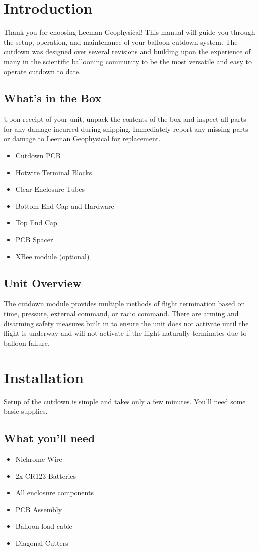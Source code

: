 \documentclass[letter,12pt,oneside,pdflatex,italian,final,twocolumn]{article}
\begin{document}
\newpage
\section{Introduction}
Thank you for choosing Leeman Geophysical! This manual will guide you through the setup, operation, and maintenance of your balloon cutdown system. The cutdown was designed over several revisions and building upon the experience of many in the scientific ballooning community to be the most versatile and easy to operate cutdown to date.

\subsection{What's in the Box}
Upon receipt of your unit, unpack the contents of the box and inspect all parts for any damage incurred during shipping. Immediately report any missing parts or damage to Leeman Geophysical for replacement.
\begin{itemize}
	\item Cutdown PCB
	\item Hotwire Terminal Blocks
	\item Clear Enclosure Tubes
	\item Bottom End Cap and Hardware
	\item Top End Cap
	\item PCB Spacer
	\item XBee module (optional)
\end{itemize}

\subsection{Unit Overview}
The cutdown module provides multiple methods of flight termination based on time, pressure, external command, or radio command. There are arming and disarming safety measures built in to ensure the unit does not activate until the flight is underway and will not activate if the flight naturally terminates due to balloon failure.



\section{Installation}
Setup of the cutdown is simple and takes only a few minutes. You’ll need some basic supplies.

\subsection{What you'll need}
\begin{itemize}
	\item Nichrome Wire
	\item 2x CR123 Batteries
	\item All enclosure components
	\item PCB Assembly
	\item Balloon load cable
	\item Diagonal Cutters
\end{itemize}
\end{document}

